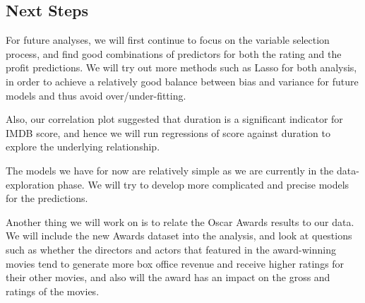 \documentclass[12pt]{article}
\begin{document}
\begin{multicols}{2}
\section{Next Steps}
\bigskip
For future analyses, we will first continue to focus on the variable selection process, and find good combinations of predictors for both the rating and the profit predictions. We will try out more methods such as Lasso for both analysis, in order to achieve a relatively good balance between bias and variance for future models and thus avoid over/under-fitting. \par
Also, our correlation plot suggested that duration is a significant indicator for IMDB score, and hence we will run regressions of score against duration to explore the underlying relationship.  
\par
The models we have for now are relatively simple as we are currently in the data-exploration phase. We will try to develop more complicated and precise models for the predictions.\par
Another thing we will work on is to relate the Oscar Awards results to our data. We will include the new Awards dataset into the analysis, and look at questions such as whether the directors and actors that featured in the award-winning movies tend to generate more box office revenue and receive higher ratings for their other movies, and also will the award has an impact on the gross and ratings of the movies.

\end{multicols}
\end{document}
